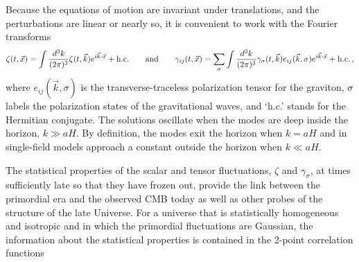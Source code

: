 Because the equations of motion are invariant under translations, and the perturbations are linear or nearly so, it is convenient to work with the Fourier transforms
\begin{equation}
\zeta(t,\vec{x})=\int \frac{d^3 k}{(2\pi)^3}\zeta(t,\vec{k})e^{i \vec{k}\cdot\vec{x}}+{\rm h.c.}\qquad{\rm and}\qquad\gamma_{ij}(t,\vec{x})=\sum\limits_\sigma\int\frac{d^3k}{(2\pi)^3}\gamma_\sigma(t,\vec{k})e_{ij}(\vec{k},\sigma)e^{i \vec{k}\cdot\vec{x}}+{\rm h.c.}\,,
\end{equation}
where $e_{ij}(\vec{k},\sigma)$ is the transverse-traceless polarization tensor for the graviton, $\sigma$ labels the polarization states of the gravitational waves,
and `h.c.' stands for the Hermitian conjugate. The solutions oscillate when the modes are deep inside the horizon, $k\gg aH$. By definition, the modes exit the horizon when $k=aH$ and in single-field models approach a constant outside the horizon when $k\ll aH$.

The statistical properties of the scalar and tensor fluctuations, $\zeta$ and $\gamma_\sigma$, at times sufficiently late so that they have frozen out, provide the link between the primordial era and the observed CMB today as well as other probes of the structure of the late Universe. For a universe that is statistically homogeneous and isotropic and in which the primordial fluctuations are Gaussian, the information about the statistical properties is contained in the 2-point correlation functions

